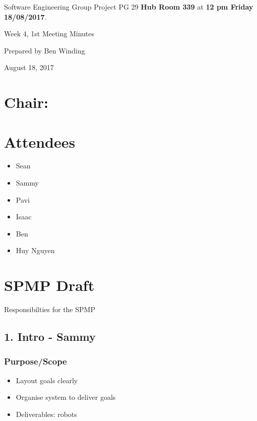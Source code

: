 \documentclass[11pt, a4paper]{article}
\begin{document}
	\noindent Software Engineering Group Project PG 29 {\bf Hub Room 339} at {\bf 12 pm Friday 18/08/2017}.
	\vspace*{10pt}
	\begin{center}
		\huge Week 4, 1st Meeting Minutes
	\end{center}
	\vspace*{10pt}
	\begin{center}
		\huge Prepared by Ben Winding
	\end{center}
	\begin{center}
		\huge August 18, 2017
	\end{center}
	\section*{Chair:}
	
	\section{Attendees}
	\begin{itemize}
		\item Sean
		\item Sammy
		\item Pavi
		\item Isaac
		\item Ben
		\item Huy Nguyen
	\end{itemize}
	
	
	
	\section{SPMP Draft}
	Responsibilties for the SPMP
	\subsection*{1. Intro - Sammy}
	\subsubsection*{Purpose/Scope}
	\begin{itemize}
		\item Layout goals clearly
		\item Organise system to deliver goals
		\item Deliverables: robots 
	\end{itemize}
\end{document}
